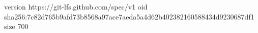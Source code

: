 version https://git-lfs.github.com/spec/v1
oid sha256:7c82d765b9afd73b8568a97ace7aeda5a4d62b402382160588434d9230687df1
size 700
